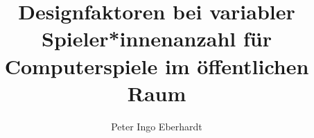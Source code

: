 \documentclass[type=bachelor,degree=engineering,theme=default,language=german,titlelanguage=german,smartquotes=true,proposal=true,aiusage=detailed]{hgbthesis}
\begin{document}


\title{Designfaktoren bei variabler Spieler*innenanzahl für Computerspiele im öffentlichen Raum}
\author{Peter Ingo Eberhardt}






\frontmatter                                       %

\maketitle
\tableofcontents

		
			

\mainmatter                             %



\MakeBibliography                                           %

\end{document}
